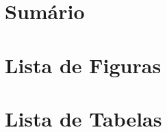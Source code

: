 
\chapter*{Sumário}
\renewcommand\contentsname{}
\tableofcontents*

\clearpage

\chapter*{Lista de Figuras}
\renewcommand\listfigurename{}
\listoffigures*
\clearpage

\chapter*{Lista de Tabelas}
\renewcommand\listtablename{}
\listoftables*
\clearpage

\renewcommand\numberline[1]{
	\leftskip -0.7em
	\rightskip 1.6em
	\parindent 0em
	Algoritmo \normalfont #1 $-$ }
\makeatother
\listofalgorithms
\clearpage
